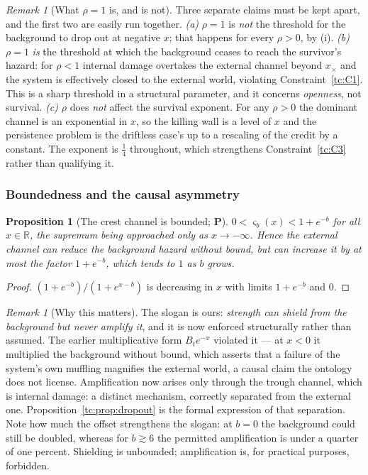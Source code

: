 \documentclass[11pt]{article}
\numberwithin{equation}{section}
\theoremstyle{plain}
\newtheorem{proposition}[theorem]{Proposition}
\theoremstyle{definition}
\theoremstyle{remark}
\newtheorem{remark}[theorem]{Remark}
\newcommand{\R}{\mathbb{R}}
\begin{document}
\begin{remark}[What $\rho=1$ is, and is not]\label{tc:rem:rhorole}
Three separate claims must be kept apart, and the first two are easily
run together.
\emph{(a)} $\rho=1$ is \emph{not} the threshold for the background to
drop out at negative $x$; that happens for every $\rho>0$, by
(i).
\emph{(b)} $\rho=1$ \emph{is} the threshold at which the background
ceases to reach the survivor's hazard: for $\rho<1$ internal damage
overtakes the external channel beyond $x_{\times}$ and the system is
effectively closed to the external world, violating
Constraint~\ref{tc:C1}. This is a sharp threshold in a structural
parameter, and it concerns \emph{openness}, not survival.
\emph{(c)} $\rho$ does \emph{not} affect the survival exponent. For any
$\rho>0$ the dominant channel is an exponential in $x$, so the killing
wall is a level of $x$ and the persistence problem is the driftless case's up
to a rescaling of the credit by a constant. The exponent is $\tfrac14$
throughout, which strengthens Constraint~\ref{tc:C3} rather than
qualifying it.
\end{remark}

\subsubsection{Boundedness and the causal asymmetry}
\label{tc:subsub:asymmetry}

\begin{proposition}[The crest channel is bounded; \textbf{P}]
\label{tc:prop:bounded}
$0<\varsigma_b(x)<1+e^{-b}$ for all $x\in\R$, the supremum being
approached only as $x\to-\infty$. Hence the external channel can
\emph{reduce} the background hazard without bound, but can
\emph{increase} it by at most the factor $1+e^{-b}$, which tends to $1$
as $b$ grows.
\end{proposition}

\begin{proof}
$(1+e^{-b})/(1+e^{x-b})$ is decreasing in $x$ with limits $1+e^{-b}$ and
$0$.
\end{proof}

\begin{remark}[Why this matters]\label{tc:rem:asymmetry}
The slogan is ours: \emph{strength can shield from the
background but never amplify it}, and it is now enforced structurally
rather than assumed. The earlier multiplicative form $B_te^{-x}$
violated it --- at $x<0$ it multiplied the background without bound,
which asserts that a failure of the system's own muffling magnifies the
external world, a causal claim the ontology does not license.
Amplification now arises only through the trough channel, which is
internal damage: a distinct mechanism, correctly separated from the
external one. Proposition~\ref{tc:prop:dropout} is the formal expression
of that separation. Note how much the offset strengthens the slogan: at
$b=0$ the background could still be doubled, whereas for $b\gtrsim6$ the
permitted amplification is under a quarter of one percent. Shielding is
unbounded; amplification is, for practical purposes, forbidden.
\end{remark}
\end{document}
